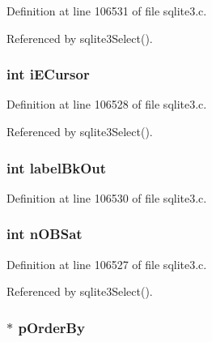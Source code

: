 Definition at line 106531 of file sqlite3.\+c.



Referenced by sqlite3\+Select().

\hypertarget{struct_sort_ctx_af85b7d63b053f06fbdf8c26cdbde67b1}{}
\subsubsection[{i\+E\+Cursor}]{\setlength{\rightskip}{0pt plus 5cm}int i\+E\+Cursor}\label{struct_sort_ctx_af85b7d63b053f06fbdf8c26cdbde67b1}


Definition at line 106528 of file sqlite3.\+c.



Referenced by sqlite3\+Select().

\hypertarget{struct_sort_ctx_ad532cc45c059d32a96797f72d40a0d86}{}
\subsubsection[{label\+Bk\+Out}]{\setlength{\rightskip}{0pt plus 5cm}int label\+Bk\+Out}\label{struct_sort_ctx_ad532cc45c059d32a96797f72d40a0d86}


Definition at line 106530 of file sqlite3.\+c.

\hypertarget{struct_sort_ctx_abf7461bfaf9f409471674af0c045dc54}{}
\subsubsection[{n\+O\+B\+Sat}]{\setlength{\rightskip}{0pt plus 5cm}int n\+O\+B\+Sat}\label{struct_sort_ctx_abf7461bfaf9f409471674af0c045dc54}


Definition at line 106527 of file sqlite3.\+c.



Referenced by sqlite3\+Select().

\hypertarget{struct_sort_ctx_a9150e506e5902e336130c9764caf96a0}{}
\subsubsection[{p\+Order\+By}]{$\ast$ p\+Order\+By}\label{struct_sort_ctx_a9150e506e5902e336130c9764caf96a0}


